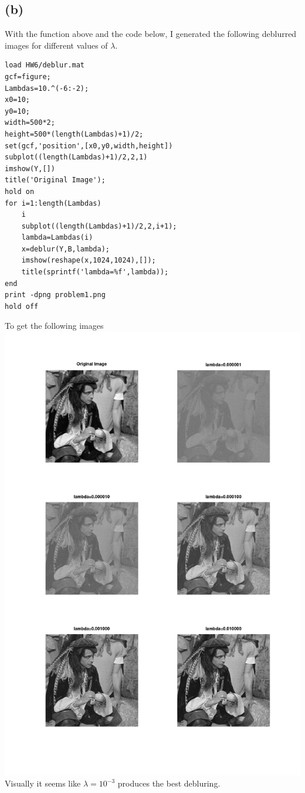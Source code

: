 \subsection*{(b)}
With the function above and the code below, I generated the following
deblurred images for different values of $\lambda$.
\begin{verbatim}
load HW6/deblur.mat
gcf=figure;
Lambdas=10.^(-6:-2);
x0=10;
y0=10;
width=500*2;
height=500*(length(Lambdas)+1)/2;
set(gcf,'position',[x0,y0,width,height])
subplot((length(Lambdas)+1)/2,2,1)
imshow(Y,[])
title('Original Image');
hold on
for i=1:length(Lambdas)
    i
    subplot((length(Lambdas)+1)/2,2,i+1);
    lambda=Lambdas(i)
    x=deblur(Y,B,lambda);
    imshow(reshape(x,1024,1024),[]);
    title(sprintf('lambda=%f',lambda));
end
print -dpng problem1.png
hold off
\end{verbatim}
To get the following images\\
\includegraphics[scale=0.25]{problem1.png}\\
Visually it seems like $\lambda =10^{-3}$ produces the best debluring.
